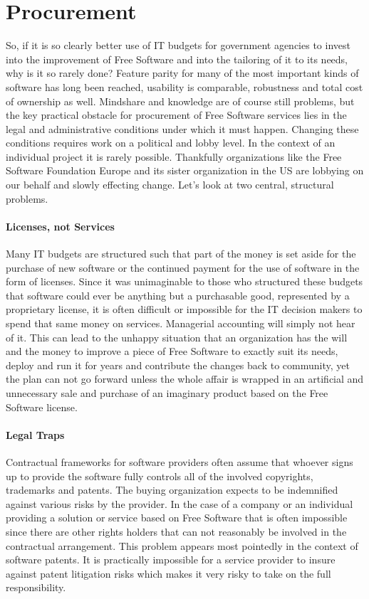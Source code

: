 \section*{Procurement}

So, if it is so clearly better use of IT budgets for government agencies to invest
into the improvement of Free Software and into the tailoring of it to its needs, why is it
so rarely done? Feature parity for many of the most important kinds of software has
long been reached, usability is comparable, robustness and total cost of ownership
as well. Mindshare and knowledge are of course still problems, but the key practical obstacle
for procurement of Free Software services lies in the legal and administrative
conditions under which it must happen. Changing these conditions requires work
on a political and lobby level. In the context of an individual project it is
rarely possible. Thankfully organizations like the Free Software Foundation Europe and
its sister organization in the US are lobbying on our behalf and slowly effecting
change. Let's look at two central, structural problems.

\paragraph*{Licenses, not Services}

Many IT budgets are structured such that part of the money is set aside
for the purchase of new software or the continued payment for the use of software
in the form of licenses. Since it was unimaginable to those who structured these
budgets that software could ever be anything but a purchasable good, represented
by a proprietary license, it is often difficult or impossible for the IT decision
makers to spend that same money on services. Managerial accounting will simply not hear of it.
This can lead to the unhappy situation that an organization has the will and the
money to improve a piece of Free Software to exactly suit its needs, deploy and run
it for years and contribute the changes back to community, yet the plan can not
go forward unless the whole affair is wrapped in an artificial and unnecessary sale
and purchase of an imaginary product based on the Free Software license.

\paragraph*{Legal Traps}

Contractual frameworks for software providers often assume
that whoever signs up to provide the software fully controls all of the involved 
copyrights, trademarks and patents. The buying organization expects to be indemnified against various
risks by the provider. In the case of a company or an individual providing a solution
or service based on Free Software that is often impossible since there are other
rights holders that can not reasonably be involved in the contractual arrangement.
This problem appears most pointedly in the context of software patents. It is practically
impossible for a service provider to insure against patent litigation risks which makes
it very risky to take on the full responsibility.

